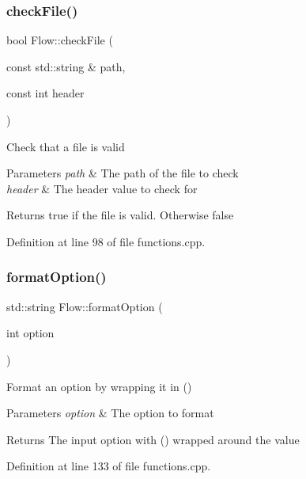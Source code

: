 \subsubsection{\texorpdfstring{check\+File()}{checkFile()}}
{\footnotesize\ttfamily bool Flow\+::check\+File (\begin{DoxyParamCaption}\item[{const std\+::string \&}]{path,  }\item[{const int}]{header }\end{DoxyParamCaption})}

Check that a file is valid 
\begin{DoxyParams}{Parameters}
{\em path} & The path of the file to check \\
\hline
{\em header} & The header value to check for \\
\hline
\end{DoxyParams}
\begin{DoxyReturn}{Returns}
true if the file is valid. Otherwise false 
\end{DoxyReturn}


Definition at line 98 of file functions.\+cpp.

\hypertarget{namespace_flow_a4d43a09e0707e54c7c176637077113af}{}\label{namespace_flow_a4d43a09e0707e54c7c176637077113af} 
\subsubsection{\texorpdfstring{format\+Option()}{formatOption()}\hspace{0.1cm}{\footnotesize\ttfamily [1/2]}}
{\footnotesize\ttfamily std\+::string Flow\+::format\+Option (\begin{DoxyParamCaption}\item[{int}]{option }\end{DoxyParamCaption})}

Format an option by wrapping it in () 
\begin{DoxyParams}{Parameters}
{\em option} & The option to format \\
\hline
\end{DoxyParams}
\begin{DoxyReturn}{Returns}
The input option with () wrapped around the value 
\end{DoxyReturn}


Definition at line 133 of file functions.\+cpp.

